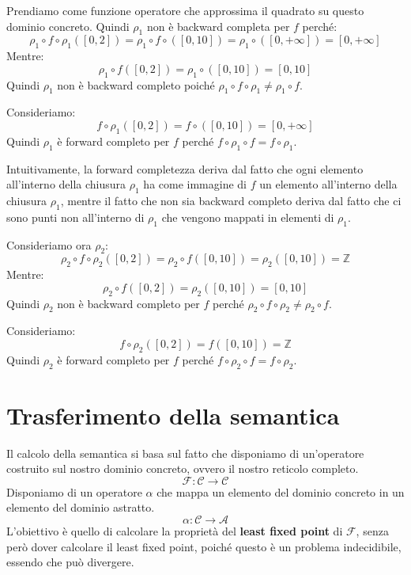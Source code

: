 Prendiamo come funzione operatore che approssima il quadrato su questo dominio
concreto.
Quindi $\rho_1$ non è backward completa per $f$ perché:
\[
    \rho_1 \circ f \circ \rho_1([0, 2]) = \rho_1 \circ f \circ ([0, 10]) 
    = \rho_1 \circ ([0, +\infty]) = [0, +\infty]
\]
Mentre:
\[
        \rho_1 \circ f([0, 2]) = \rho_1 \circ ([0, 10]) = [0, 10]
\]
Quindi $\rho_1$ non è backward completo poiché 
$\rho_1 \circ f \circ \rho_1 \neq \rho_1 \circ f$.

Consideriamo:
\[
  f \circ \rho_1([0, 2]) = f \circ ([0, 10]) = [0, +\infty] 
\]
Quindi $\rho_1$ è forward completo per $f$ perché 
$f \circ \rho_1 \circ f = f \circ \rho_1$.

\begin{tcolorbox}
    Intuitivamente, la forward completezza deriva dal fatto che ogni elemento 
    all'interno della chiusura $\rho_1$ ha come immagine di $f$ un elemento 
    all'interno della chiusura $\rho_1$, mentre il fatto che non sia backward
    completo deriva dal fatto che ci sono punti non all'interno di $\rho_1$ che
    vengono mappati in elementi di $\rho_1$.
\end{tcolorbox}

Consideriamo ora $\rho_2$:
\[
    \rho_2 \circ f \circ \rho_2([0, 2]) = \rho_2 \circ f ([0, 10]) 
    = \rho_2 ([0, 10]) = \mathbb{Z}
\]
Mentre:
\[
    \rho_2 \circ f ([0, 2]) = \rho_2 ([0, 10]) = [0, 10]
\]
Quindi $\rho_2$ non è backward completo per $f$ perché
$\rho_2 \circ f \circ \rho_2 \not= \rho_2 \circ f$.

Consideriamo:
\[
    f \circ \rho_2 ([0, 2]) = f ([0, 10]) = \mathbb{Z}
\]
Quindi $\rho_2$ è forward completo per $f$ perché
$f \circ \rho_2 \circ f = f \circ \rho_2$.

\section{Trasferimento della semantica}
Il calcolo della semantica si basa sul fatto che disponiamo di un'operatore 
costruito sul nostro dominio concreto, ovvero il nostro reticolo completo.
\[
  \mathcal{F}: \mathcal{C} \rightarrow \mathcal{C}  
\]
Disponiamo di un operatore $\alpha$ che mappa un elemento del dominio concreto
in un elemento del dominio astratto.
\[
    \alpha: \mathcal{C} \rightarrow \mathcal{A}
\]
L'obiettivo è quello di calcolare la proprietà del \textbf{least fixed point}
di $\mathcal{F}$, senza però dover calcolare il least fixed point, poiché 
questo è un problema indecidibile, essendo che può divergere.

